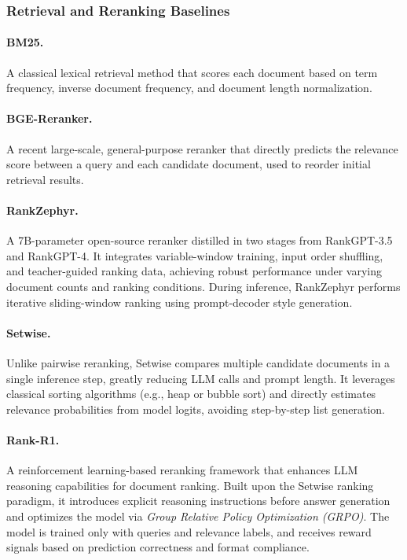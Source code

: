 \documentclass{applemlr}
\numberwithin{equation}{section}
\begin{document}
\subsubsection{Retrieval and Reranking Baselines}

\paragraph{BM25.}
A classical lexical retrieval method that scores each document based on 
term frequency, inverse document frequency, and document length normalization.

\paragraph{BGE-Reranker. \citep{bge_m3}}
A recent large-scale, general-purpose reranker that directly predicts the relevance score 
between a query and each candidate document, used to reorder initial retrieval results.

\paragraph{RankZephyr. \citep{pradeep2023rankzephyreffectiverobustzeroshot} }
A 7B-parameter open-source reranker distilled in two stages from RankGPT-3.5 and RankGPT-4. 
It integrates variable-window training, input order shuffling, and teacher-guided ranking data, 
achieving robust performance under varying document counts and ranking conditions. 
During inference, RankZephyr performs iterative sliding-window ranking using prompt-decoder style generation.

\paragraph{Setwise. \citep{10.1145/3626772.3657813}}
Unlike pairwise reranking, Setwise compares multiple candidate documents in a single inference step, 
greatly reducing LLM calls and prompt length. 
It leverages classical sorting algorithms (e.g., heap or bubble sort) 
and directly estimates relevance probabilities from model logits, 
avoiding step-by-step list generation.

\paragraph{Rank-R1. \citep{zhuang2025rankr1enhancingreasoningllmbased}}
A reinforcement learning-based reranking framework 
that enhances LLM reasoning capabilities for document ranking. 
Built upon the Setwise ranking paradigm, 
it introduces explicit reasoning instructions before answer generation 
and optimizes the model via \textit{Group Relative Policy Optimization (GRPO)}. 
The model is trained only with queries and relevance labels, 
and receives reward signals based on prediction correctness and format compliance.
\end{document}
